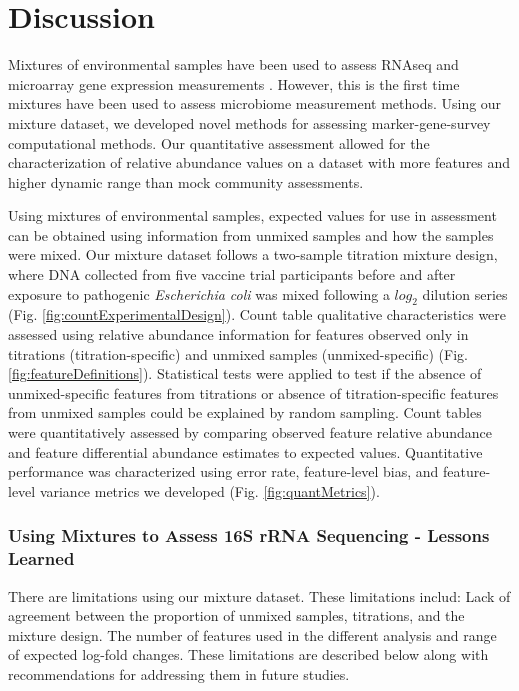 \documentclass[linenumbers]{bmcart}
\begin{document}
\section*{Discussion}
Mixtures of environmental samples have been used to assess
RNAseq and microarray gene expression measurements \cite{parsons2015using, pine2011adaptable, thompson2005use}. However, this is the
first time mixtures have been used to assess microbiome measurement
methods. Using our mixture dataset, we developed novel methods for
assessing marker-gene-survey computational methods. Our quantitative
assessment allowed for the characterization of relative abundance values
on a dataset with more features and higher dynamic range than mock community assessments.

Using mixtures of environmental samples, expected values for use in assessment can be obtained using information from unmixed samples and how the samples were mixed.
Our mixture dataset follows a
two-sample titration mixture design, where DNA collected from five vaccine trial participants before and
after exposure to pathogenic \emph{Escherichia coli}  was mixed following a \(log_2\) dilution
series (Fig. \ref{fig:countExperimentalDesign}).
Count table qualitative characteristics were assessed using relative abundance information for
features observed only in titrations (titration-specific) and unmixed samples (unmixed-specific) (Fig. \ref{fig:featureDefinitions}).
Statistical tests were applied to test if the absence of unmixed-specific features from titrations or absence of titration-specific features from unmixed samples could be explained by random sampling.
Count tables were quantitatively assessed by comparing observed feature relative abundance and feature differential abundance estimates to expected values.
Quantitative performance was characterized using error rate, feature-level bias, and feature-level variance metrics we developed (Fig. \ref{fig:quantMetrics}).

\subsubsection*{Using Mixtures to Assess 16S rRNA Sequencing - Lessons Learned}

There are limitations using our mixture dataset. These limitations
includ: Lack of agreement between the proportion of unmixed samples,
titrations, and the mixture design. The number of features used in the
different analysis and range of expected log-fold changes.
These limitations are described below along with
recommendations for addressing them in future studies.
\end{document}
